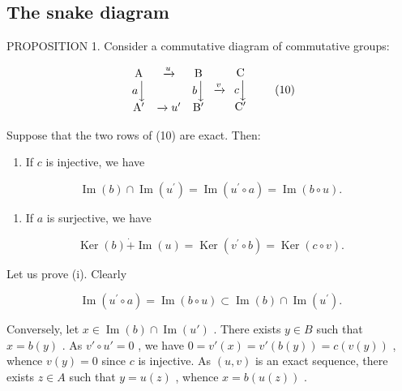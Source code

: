 \subsection{The snake diagram}

PROPOSITION 1. Consider a commutative diagram of commutative groups:

\[
\begin{array}{c c c} \mathrm{A} & \xrightarrow {u} & \mathrm{B} \\ a \Big \downarrow & & b \Big \downarrow \\ \mathrm{A} ^ {\prime} & \xrightarrow {} u ^ {\prime} & \mathrm{B} ^ {\prime} \end{array} \xrightarrow {v} \begin{array}{c c c} \mathrm{C} \\ c \Big \downarrow \\ \mathrm{C} ^ {\prime} \end{array}\tag{10}
\]

Suppose that the two rows of (10) are exact. Then:

\begin{enumerate}
\def\labelenumi{(\roman{enumi})}
\tightlist
\item
  If \(c\) is injective, we have
\end{enumerate}

\[
\operatorname{Im} (b) \cap \operatorname{Im} (u ^ {\prime}) = \operatorname{Im} (u ^ {\prime} \circ a) = \operatorname{Im} (b \circ u).\tag{11}
\]

\begin{enumerate}
\def\labelenumi{(\roman{enumi})}
\setcounter{enumi}{1}
\tightlist
\item
  If \(a\) is surjective, we have
\end{enumerate}

\[
\operatorname{Ker} (b) \dot {+} \operatorname{Im} (u) = \operatorname{Ker} (v ^ {\prime} \circ b) = \operatorname{Ker} (c \circ v).\tag{12}
\]

Let us prove (i). Clearly

\[
\operatorname{Im} (u ^ {\prime} \circ a) = \operatorname{Im} (b \circ u) \subset \operatorname{Im} (b) \cap \operatorname{Im} (u ^ {\prime}).
\]

Conversely, let \(x \in \operatorname{Im}(b) \cap \operatorname{Im}(u')\) . There exists \(y \in B\) such that \(x = b(y)\) . As \(v' \circ u' = 0\) , we have \(0 = v'(x) = v'(b(y)) = c(v(y))\) , whence \(v(y) = 0\) since \(c\) is injective. As \((u, v)\) is an exact sequence, there exists \(z \in A\) such that \(y = u(z)\) , whence \(x = b(u(z))\) .

